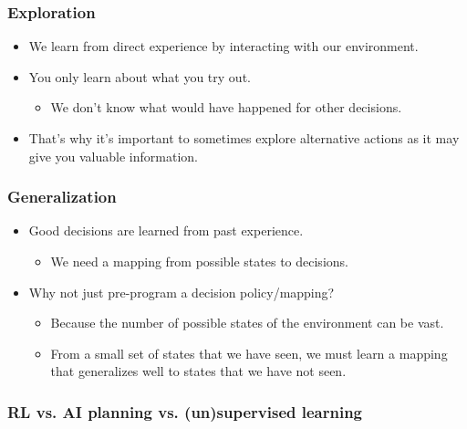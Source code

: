 \subsubsection{Exploration}
\begin{summary}
    \begin{itemize}
        \item We learn from direct experience by interacting with our environment.
        \item You only learn about what you try out.
        \begin{itemize}
            \item We don’t know what would have happened for other decisions.
        \end{itemize}
        \item That's why it's important to sometimes explore alternative actions as it may give you valuable information.
    \end{itemize}
\end{summary}

\subsubsection{Generalization}
\begin{summary}
    \begin{itemize}
        \item Good decisions are learned from past experience.
        \begin{itemize}
            \item We need a mapping from possible states to decisions.
        \end{itemize}
        \item Why not just pre-program a decision policy/mapping?
        \begin{itemize}
            \item Because the number of possible states of the environment can be vast.
            \item From a small set of states that we have seen, we must learn a mapping that generalizes well to states that we have not seen.
        \end{itemize}
    \end{itemize}
\end{summary}

\subsubsection{RL vs. AI planning vs. (un)supervised learning}
\begin{summary}
\end{summary}

